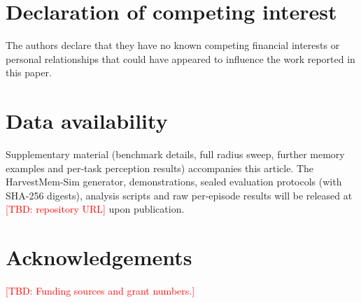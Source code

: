 \documentclass[preprint,12pt,authoryear]{elsarticle}
\newcommand{\tbd}[1]{\textcolor{red}{[TBD: #1]}}
\begin{document}
\section*{Declaration of competing interest}
The authors declare that they have no known competing financial interests or personal relationships that could have appeared to influence the work reported in this paper.

\section*{Data availability}
Supplementary material (benchmark details, full radius sweep, further memory examples and per-task perception results) accompanies this article. The HarvestMem-Sim generator, demonstrations, sealed evaluation protocols (with SHA-256 digests), analysis scripts and raw per-episode results will be released at \tbd{repository URL} upon publication.

\section*{Acknowledgements}
\tbd{Funding sources and grant numbers.}


\renewcommand{\bibfont}{\footnotesize}
\setlength{\bibsep}{0pt}

\end{document}
